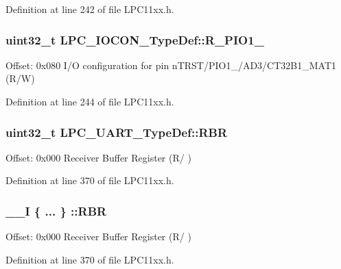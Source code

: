 Definition at line 242 of file L\+P\+C11xx.\+h.

\subsubsection[{\texorpdfstring{R\+\_\+\+P\+I\+O1\+\_\+2}{R_PIO1_2}}]{ uint32\+\_\+t L\+P\+C\+\_\+\+I\+O\+C\+O\+N\+\_\+\+Type\+Def\+::\+R\+\_\+\+P\+I\+O1\+\_}\hypertarget{group___l_p_c11xx___definitions_gaaade79f615353aeb33fda16202c368fc}{}\label{group___l_p_c11xx___definitions_gaaade79f615353aeb33fda16202c368fc}
Offset\+: 0x080 I/O configuration for pin n\+T\+R\+S\+T/\+P\+I\+O1\+\_/\+A\+D3/\+C\+T32\+B1\+\_\+\+M\+A\+T1 (R/W) 

Definition at line 244 of file L\+P\+C11xx.\+h.

\subsubsection[{\texorpdfstring{R\+BR}{RBR}}]{ uint32\+\_\+t L\+P\+C\+\_\+\+U\+A\+R\+T\+\_\+\+Type\+Def\+::\+R\+BR}\hypertarget{group___l_p_c11xx___definitions_ga7f91d69f11beff3ba1c9b067cc547d18}{}\label{group___l_p_c11xx___definitions_ga7f91d69f11beff3ba1c9b067cc547d18}
Offset\+: 0x000 Receiver Buffer Register (R/ ) 

Definition at line 370 of file L\+P\+C11xx.\+h.

\subsubsection[{\texorpdfstring{R\+BR}{RBR}}]{\setlength{\rightskip}{0pt plus 5cm}\+\_\+\+\_\+I \{ ... \} \+::R\+BR}\hypertarget{group___l_p_c11xx___definitions_gaeeaa620d68eb3bd4bed02b53296cf472}{}\label{group___l_p_c11xx___definitions_gaeeaa620d68eb3bd4bed02b53296cf472}
Offset\+: 0x000 Receiver Buffer Register (R/ ) 

Definition at line 370 of file L\+P\+C11xx.\+h.

